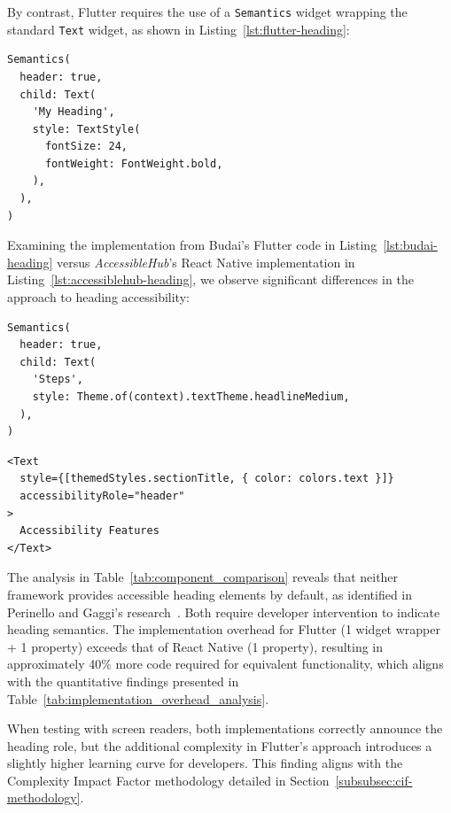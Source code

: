 By contrast, Flutter requires the use of a \texttt{Semantics} widget wrapping the standard \texttt{Text} widget, as shown in Listing~\ref{lst:flutter-heading}:

\begin{lstlisting}[style=DartStyle, caption=Heading implementation in Flutter, label=lst:flutter-heading]
Semantics(
  header: true,
  child: Text(
    'My Heading',
    style: TextStyle(
      fontSize: 24,
      fontWeight: FontWeight.bold,
    ),
  ),
)
\end{lstlisting}

Examining the implementation from Budai's Flutter code in Listing~\ref{lst:budai-heading} versus \textit{AccessibleHub}'s React Native implementation in Listing~\ref{lst:accessiblehub-heading}, we observe significant differences in the approach to heading accessibility:

\begin{lstlisting}[style=DartStyle, caption=Budai's Flutter implementation of headers, label=lst:budai-heading]
Semantics(
  header: true,
  child: Text(
    'Steps',
    style: Theme.of(context).textTheme.headlineMedium,
  ),
)
\end{lstlisting}

\begin{lstlisting}[style=ReactNativeStyle, caption=\textit{AccessibleHub}'s React Native implementation of headers, label=lst:accessiblehub-heading]
<Text 
  style={[themedStyles.sectionTitle, { color: colors.text }]} 
  accessibilityRole="header"
>
  Accessibility Features
</Text>
\end{lstlisting}

\pagebreak

The analysis in Table~\ref{tab:component_comparison} reveals that neither framework provides accessible heading elements by default, as identified in Perinello and Gaggi's research~\cite{perinello2024accessibility}. Both require developer intervention to indicate heading semantics. The implementation overhead for Flutter (1 widget wrapper + 1 property) exceeds that of React Native (1 property), resulting in approximately 40\% more code required for equivalent functionality, which aligns with the quantitative findings presented in Table~\ref{tab:implementation_overhead_analysis}.

When testing with screen readers, both implementations correctly announce the heading role, but the additional complexity in Flutter's approach introduces a slightly higher learning curve for developers. This finding aligns with the Complexity Impact Factor methodology detailed in Section~\ref{subsubsec:cif-methodology}.

